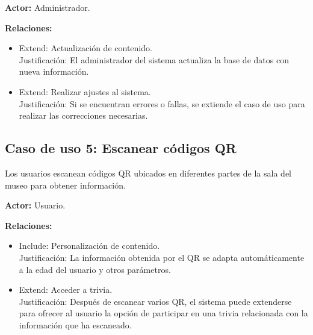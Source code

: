 \documentclass{report}
\begin{document}
    \textbf{Actor:} Administrador.

    \textbf{Relaciones:}
    \begin{itemize}
        \item Extend: Actualización de contenido.\\
        Justificación: El administrador del sistema actualiza la base de datos con nueva información.
        \item Extend: Realizar ajustes al sistema.\\
        Justificación: Si se encuentran errores o fallas, se extiende el caso de uso para realizar las correcciones necesarias.
    \end{itemize}

    \subsection*{Caso de uso 5: Escanear códigos QR}
    Los usuarios escanean códigos QR ubicados en diferentes partes de la sala del museo para obtener información.

    \textbf{Actor:} Usuario.

    \textbf{Relaciones:}
    \begin{itemize}
        \item Include: Personalización de contenido.\\
        Justificación: La información obtenida por el QR se adapta automáticamente a la edad del usuario y otros parámetros.
        \item Extend: Acceder a trivia.\\
        Justificación: Después de escanear varios QR, el sistema puede extenderse para ofrecer al usuario la opción de participar en una trivia relacionada con la información que ha escaneado.
    \end{itemize}
\end{document}
